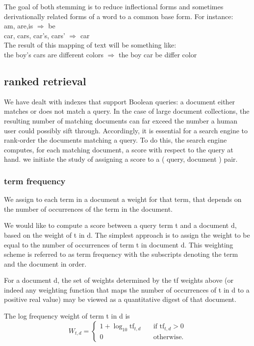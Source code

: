 \begin{itemize}
    The goal of both stemming is to reduce inflectional forms and sometimes derivationally related forms of a word to a common base form.
    For instance:\\
    am, are,is $\Rightarrow$  be \\
    car, cars, car's, cars' $\Rightarrow$  car \\
    The result of this mapping of text will be something like:\\
    the boy's cars are different colors  $\Rightarrow$   the  boy  car  be  differ   color

\end{itemize} 

\subsection{ranked retrieval}

We have dealt with indexes that support Boolean queries: a document
either matches or does not match a query. In the case of large document
collections, the resulting number of matching documents can far exceed the
number a human user could possibly sift through. Accordingly, it is essential
for a search engine to rank-order the documents matching a query. 
To do this, the search engine computes, for each matching document, a score with
respect to the query at hand. 
we initiate the study of assigning a score to a ( query, document ) pair.

\subsubsection{term frequency}

We assign to each term in a document a weight for that term, that depends on the number of occurrences of the term in the document.

We would like to compute a score between a query term t and a document d, based on the weight of t in d. The simplest approach is to assign the weight to be equal to the number of occurrences of term t in document d.
This weighting scheme is referred to as term frequency with the subscripts denoting the term and the document in order.

For a document d, the set of weights determined by the tf weights above (or indeed any weighting function that maps the number of occurrences of t in d to a positive real value) may be viewed as a quantitative digest of that document.


The log frequency weight of term t in d is\\
\begin{equation}
    W_{t,d} =\begin{cases} 
   1+\log_{10}\text{tf}_{t,d} &\quad \text{if  }\text{tf}_{t,d} > 0  \\ 0  &\quad  \text{otherwise.} \end{cases}
\end{equation}
  
